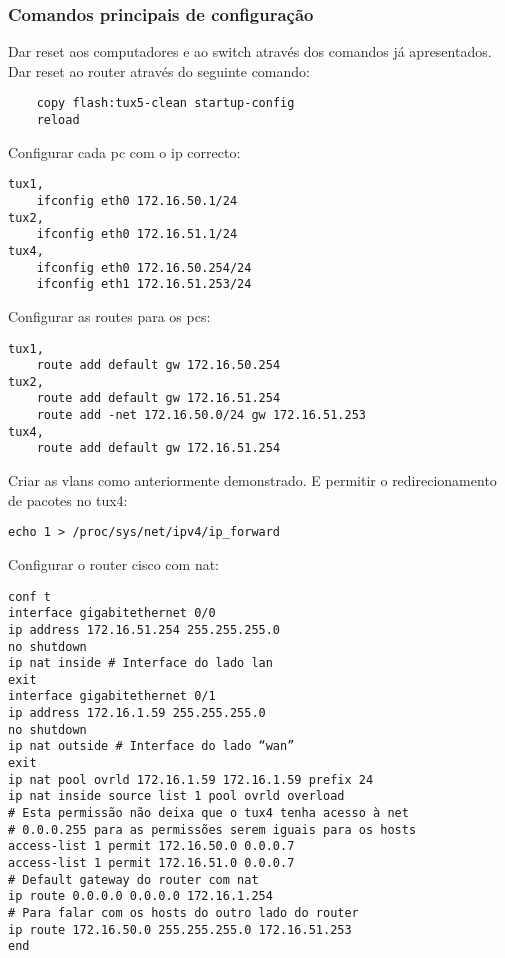 \documentclass[a4paper]{article}
\begin{document}
\subsubsection{Comandos principais de configuração}

Dar reset aos computadores e ao switch através dos comandos já apresentados.\\

Dar reset ao router através do seguinte comando:
\begin{verbatim}
    copy flash:tux5-clean startup-config
    reload
\end{verbatim}

Configurar cada pc com o ip correcto:
\begin{verbatim}
tux1,
    ifconfig eth0 172.16.50.1/24
tux2,
    ifconfig eth0 172.16.51.1/24
tux4,
    ifconfig eth0 172.16.50.254/24
    ifconfig eth1 172.16.51.253/24
\end{verbatim}

Configurar as routes para os pcs:
\begin{verbatim}
tux1,
    route add default gw 172.16.50.254
tux2,
    route add default gw 172.16.51.254
    route add -net 172.16.50.0/24 gw 172.16.51.253
tux4,
    route add default gw 172.16.51.254
\end{verbatim}

Criar as vlans como anteriormente demonstrado. E permitir o redirecionamento de
pacotes no tux4:
\begin{verbatim}
echo 1 > /proc/sys/net/ipv4/ip_forward
\end{verbatim}

Configurar o router cisco com nat:
\begin{verbatim}
conf t
interface gigabitethernet 0/0
ip address 172.16.51.254 255.255.255.0
no shutdown
ip nat inside # Interface do lado lan
exit
interface gigabitethernet 0/1
ip address 172.16.1.59 255.255.255.0
no shutdown
ip nat outside # Interface do lado “wan”
exit
ip nat pool ovrld 172.16.1.59 172.16.1.59 prefix 24
ip nat inside source list 1 pool ovrld overload
# Esta permissão não deixa que o tux4 tenha acesso à net
# 0.0.0.255 para as permissões serem iguais para os hosts
access-list 1 permit 172.16.50.0 0.0.0.7
access-list 1 permit 172.16.51.0 0.0.0.7
# Default gateway do router com nat
ip route 0.0.0.0 0.0.0.0 172.16.1.254
# Para falar com os hosts do outro lado do router
ip route 172.16.50.0 255.255.255.0 172.16.51.253
end
\end{verbatim}
\end{document}
